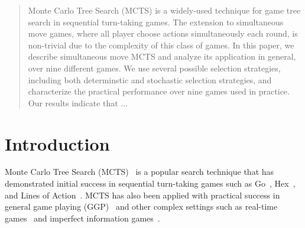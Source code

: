 \documentclass[conference]{IEEEtran}
\begin{document}




\maketitle


\begin{abstract}
Monte Carlo Tree Search (MCTS) is a widely-used technique for game tree search in sequential turn-taking games. 
The extension to simultaneous move games, where all player choose actions simultaneously each round, 
is non-trivial due to the complexity of this class of games. In this paper, we describe simultaneous move MCTS 
and analyze its application in general, over nine different games. We use several possible selection strategies, 
including both determinstic and stochastic selection strategies, and characterize the practical performance over 
nine games used in practice. Our results indicate that ... 
\end{abstract}





%
\IEEEpeerreviewmaketitle

\section{Introduction}

Monte Carlo Tree Search (MCTS)~\cite{Coulom06Efficient,Kocsis06Bandit} is a popular search technique 
that has demonstrated initial success in sequential turn-taking games such as Go~\cite{Gelly12}, Hex~\cite{Arneson10Hex},
and Lines of Action~\cite{Winands10MCTS-LOA}. MCTS has also been applied with practical success in general game playing 
(GGP)~\cite{Bjornsson09CadiaPlayer} and other complex settings such as real-time 
games~\cite{Balla09UCT,Pepels14Monte} 
and imperfect information games~\cite{Buro09Improving,Cowling12ISMCTS}.
\end{document}

